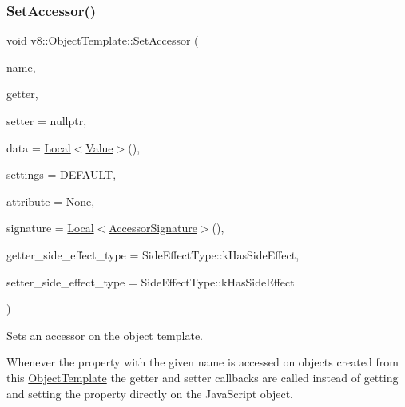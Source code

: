 \subsubsection{\texorpdfstring{Set\+Accessor()}{SetAccessor()}}
{\footnotesize\ttfamily void v8\+::\+Object\+Template\+::\+Set\+Accessor (\begin{DoxyParamCaption}\item[{\mbox{\hyperlink{classv8_1_1Local}{v8\+::\+Local}}$<$ \mbox{\hyperlink{classv8_1_1String}{String}} $>$}]{name,  }\item[{\mbox{\hyperlink{namespacev8_a722613c87061708a4f1aa050d095f868}{Accessor\+Getter\+Callback}}}]{getter,  }\item[{Accessor\+Setter\+Callback}]{setter = {\ttfamily nullptr},  }\item[{\mbox{\hyperlink{classv8_1_1Local}{v8\+::\+Local}}$<$ \mbox{\hyperlink{classv8_1_1Value}{Value}} $>$}]{data = {\ttfamily \mbox{\hyperlink{classv8_1_1Local}{Local}}$<$\mbox{\hyperlink{classv8_1_1Value}{Value}}$>$()},  }\item[{\mbox{\hyperlink{namespacev8_a31d8355cb043d7d2dda3f4a52760b64e}{Access\+Control}}}]{settings = {\ttfamily DEFAULT},  }\item[{\mbox{\hyperlink{namespacev8_a05f25f935e108a1ea2d150e274602b87}{Property\+Attribute}}}]{attribute = {\ttfamily \mbox{\hyperlink{namespacev8_a05f25f935e108a1ea2d150e274602b87a7ab4d58719c33b3ea2dfaefa29b111df}{None}}},  }\item[{\mbox{\hyperlink{classv8_1_1Local}{v8\+::\+Local}}$<$ \mbox{\hyperlink{classv8_1_1AccessorSignature}{Accessor\+Signature}} $>$}]{signature = {\ttfamily \mbox{\hyperlink{classv8_1_1Local}{Local}}$<$\mbox{\hyperlink{classv8_1_1AccessorSignature}{Accessor\+Signature}}$>$()},  }\item[{\mbox{\hyperlink{namespacev8_a29711319c2b9fc7716d65faee2f7b9cb}{Side\+Effect\+Type}}}]{getter\+\_\+side\+\_\+effect\+\_\+type = {\ttfamily SideEffectType\+:\+:kHasSideEffect},  }\item[{\mbox{\hyperlink{namespacev8_a29711319c2b9fc7716d65faee2f7b9cb}{Side\+Effect\+Type}}}]{setter\+\_\+side\+\_\+effect\+\_\+type = {\ttfamily SideEffectType\+:\+:kHasSideEffect} }\end{DoxyParamCaption})}

Sets an accessor on the object template.

Whenever the property with the given name is accessed on objects created from this \mbox{\hyperlink{classv8_1_1ObjectTemplate}{Object\+Template}} the getter and setter callbacks are called instead of getting and setting the property directly on the Java\+Script object.



